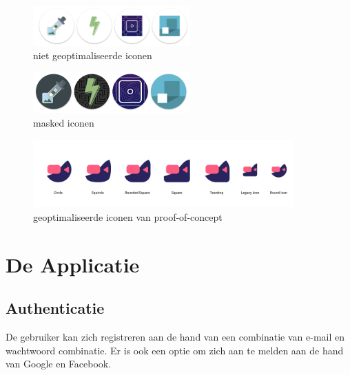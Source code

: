 		\begin{figure}[H]
			\centering
			\includegraphics[width=60mm]{./img/traditionalIcons}{}
			\caption{niet geoptimaliseerde iconen}
		\end{figure}
		\begin{figure}[H]
			\centering
			\includegraphics[width=60mm]{./img/maskedicons}{}
			\caption{masked iconen}
		\end{figure}
		\begin{figure}[H]
			\centering
			\includegraphics[width=100mm]{./img/iconPWA.png}{}
			\caption{geoptimaliseerde iconen van proof-of-concept}
		\end{figure}


\section{De Applicatie}
	\subsection{Authenticatie}
		De gebruiker kan zich registreren aan de hand van een combinatie van e-mail en wachtwoord combinatie. Er is ook een optie om zich aan te melden aan de hand van Google en Facebook.
		
